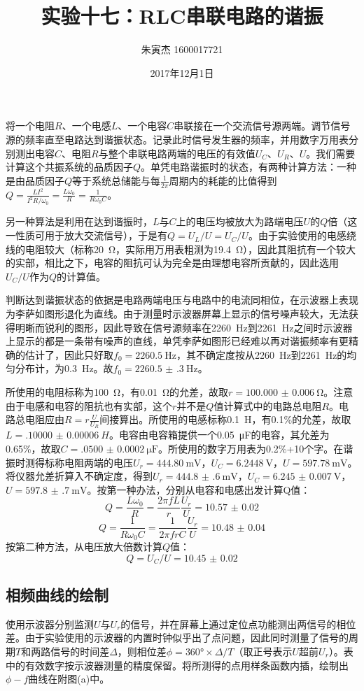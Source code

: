 \documentclass[UTF8]{ctexart}
\title{实验十七：RLC串联电路的谐振}
\author{朱寅杰 1600017721}
\date{2017年12月1日}
\begin{document}
\maketitle
将一个电阻$R$、一个电感$L$、一个电容$C$串联接在一个交流信号源两端。调节信号源的频率直至电路达到谐振状态。记录此时信号发生器的频率，并用数字万用表分别测出电容$C$、电阻$R$与整个串联电路两端的电压的有效值$U_C$、$U_R$、$U$。我们需要计算这个共振系统的品质因子$Q$。单凭电路谐振时的状态，有两种计算方法：一种是由品质因子$Q$等于系统总储能与每$\frac{1}{2\pi}$周期内的耗能的比值得到$Q=\frac{LI^2}{I^2R/\omega_0}=\frac{L\omega_0}{R}=\frac{1}{R\omega_0C}$。

另一种算法是利用在达到谐振时，$L$与$C$上的电压均被放大为路端电压$U$的$Q$倍（这一性质可用于放大交流信号），于是有$Q=U_L/U=U_C/U$。由于实验使用的电感绕线的电阻较大（标称\SI{20}{\ohm}，实际用万用表粗测为\SI{19.4}{\ohm}），因此其阻抗有一个较大的实部，相比之下，电容的阻抗可认为完全是由理想电容所贡献的，因此选用$U_C/U$作为$Q$的计算值。

判断达到谐振状态的依据是电路两端电压与电路中的电流同相位，在示波器上表现为李萨如图形退化为直线。由于测量时示波器屏幕上显示的信号噪声较大，无法获得明晰而锐利的图形，因此导致在信号源频率在\SI{2260}{\Hz}到\SI{2261}{\Hz}之间时示波器上显示的都是一条带有噪声的直线，单凭李萨如图形已经难以再对谐振频率有更精确的估计了，因此只好取$f_0=\SI{2260.5}{\Hz}$，其不确定度按从\SI{2260}{\Hz}到\SI{2261}{\Hz}的均匀分布计，为\SI{.3}{\Hz}。故$f_0=\SI{2260.5(3)}{\Hz}$。

所使用的电阻标称为\SI{100}{\ohm}，有\SI{.01}{\ohm}的允差，故取$r=\SI{100.000(6)}{\ohm}$。注意由于电感和电容的阻抗也有实部，这个$r$并不是$Q$值计算式中的电路总电阻$R$。电路总电阻应由$R=r\frac{U}{U_R}$间接算出。所使用的电感标称\SI{.1}{H}，有0.1\%的允差，故取$L=\SI{.10000(6)}{H}$。电容由电容箱提供一个\SI{.05}{\micro\F}的电容，其允差为0.65\%，故取$C=\SI{.0500(2)}{\micro\F}$。所使用的数字万用表为0.2\%+10个字。在谐振时测得标称电阻两端的电压$U_r=\SI{444.80}{\mV}$，$U_C=\SI{6.2448}{\V}$，$U=\SI{597.78}{\mV}$。将仪器允差折算入不确定度，得到$U_r=\SI{444.8(6)}{\mV}$，$U_C=\SI{6.245(7)}{\V}$，$U=\SI{597.8(7)}{\mV}$。按第一种办法，分别从电容和电感出发计算Q值：
\[Q=\frac{L\omega_0}{R}=\frac{2\pi fL}{r}\frac{U_r}{U}=\num{10.57(2)}\]
\[Q=\frac{1}{R\omega_0C}=\frac{1}{2\pi frC}\frac{U_r}{U}=\num{10.48(4)}\]
按第二种方法，从电压放大倍数计算$Q$值：
\[Q=U_C/U=\num{10.45(2)}\]


\subsection{相频曲线的绘制}
使用示波器分别监测$U$与$U_r$的信号，并在屏幕上通过定位点功能测出两信号的相位差。由于实验使用的示波器的内置时钟似乎出了点问题，因此同时测量了信号的周期$T$和两路信号的时间差$\Delta$，则相位差$\phi=\ang{360}\times\Delta/T$（取正号表示$U$超前$U_r$）。表中的有效数字按示波器测量的精度保留。将所测得的点用样条函数内插，绘制出$\phi-f$曲线在附图(a)中。
\end{document}
